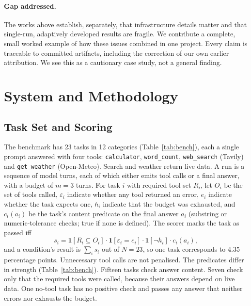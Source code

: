 \documentclass[runningheads]{llncs}
\begin{document}
\paragraph{Gap addressed.}
The works above establish, separately, that infrastructure details matter and that single-run, adaptively developed results are fragile. We contribute a complete, small worked example of how these issues combined in one project. Every claim is traceable to committed artifacts, including the correction of our own earlier attribution. We see this as a cautionary case study, not a general finding.

\section{System and Methodology}
\label{sec:method}

\subsection{Task Set and Scoring}
\label{sec:tasks}

The benchmark has 23 tasks in 12 categories (Table~\ref{tab:bench}), each a single prompt answered with four tools: \texttt{calculator}, \texttt{word\_count}, \texttt{web\_search} (Tavily) and \texttt{get\_weather} (Open-Meteo). Search and weather return live data. A run is a sequence of model turns, each of which either emits tool calls or a final answer, with a budget of $m=3$ turns. For task $i$ with required tool set $R_i$, let $O_i$ be the set of tools called, $\varepsilon_i$ indicate whether any tool returned an error, $e_i$ indicate whether the task expects one, $h_i$ indicate that the budget was exhausted, and $c_i(a_i)$ be the task's content predicate on the final answer $a_i$ (substring or numeric-tolerance checks; true if none is defined). The scorer marks the task as passed iff
\begin{equation}
s_i = \mathbf{1}[R_i \subseteq O_i]\cdot \mathbf{1}[\varepsilon_i = e_i]\cdot \mathbf{1}[\neg h_i]\cdot c_i(a_i),
\label{eq:score}
\end{equation}
and a condition's result is $\sum_i s_i$ out of $N=23$, so one task corresponds to 4.35 percentage points. Unnecessary tool calls are not penalised. The predicates differ in strength (Table~\ref{tab:bench}). Fifteen tasks check answer content. Seven check only that the required tools were called, because their answers depend on live data. One no-tool task has no positive check and passes any answer that neither errors nor exhausts the budget.
\end{document}
